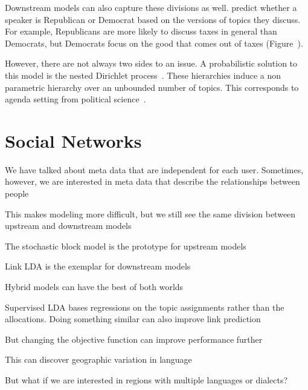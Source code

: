 Downstream models can also capture these divisions as well.
\citet{nguyen-13:shlda} predict whether a speaker is Republican or
Democrat based on the versions of topics they discuss.  For example,
Republicans are more likely to discuss taxes in general than
Democrats, but Democrats focus on the good that comes out of taxes
(Figure~\cite{fig:shlda-taxes}).

However, there are not always two sides to an issue.  A probabilistic
solution to this model is the nested Dirichlet
process~\citep{blei-07}.  These hierarchies induce a non parametric
hierarchy over an unbounded number of topics.  This corresponds to
agenda setting from political
science~\citep{Nguyen:Boyd-Graber:Resnik:Miler-2015}.


\section{Social Networks}

We have talked about meta data that are independent for each user.
Sometimes, however, we are interested in meta data that describe the
relationships between people

This makes modeling more difficult, but we still see the same division
between upstream and downstream models

The stochastic block model is the prototype for upstream models~\cite{airoldi-08}

Link LDA is the exemplar for downstream models~\cite{nallapati-08}

Hybrid models can have the best of both worlds

Supervised LDA bases regressions on the topic assignments rather than
the allocations.  Doing something similar can also improve link prediction~\citep{chang-09a}

But changing the objective function can improve performance further~\cite{bach-15}

This can discover geographic variation in language~\cite{eisenstein-10}



But what if we are interested in regions with multiple languages or
dialects?

